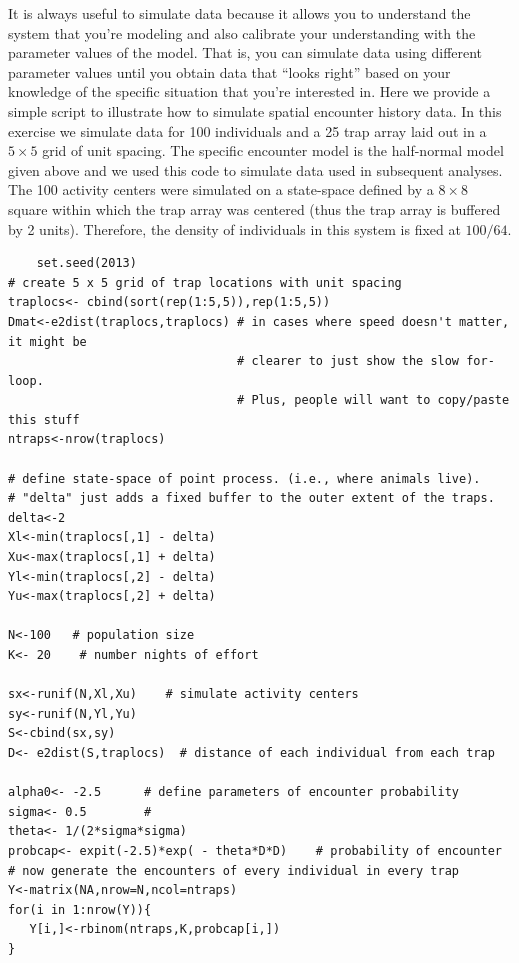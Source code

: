 It is always useful to simulate data because it allows you to
understand the system that you're modeling and also calibrate your
understanding with the parameter values of the model. That is, you can
simulate data using different parameter values until you obtain data
that ``looks right'' based on your knowledge of the specific situation
that you're interested in. Here we provide a simple script to
illustrate how to simulate spatial encounter history data. In this
exercise we simulate data for 100 individuals and a 25 trap array laid
out in a $5 \times 5$ grid of unit spacing.  The specific encounter model is
the half-normal model given above and we used this code to simulate
data used in subsequent analyses.  The 100 activity centers were
simulated on a state-space defined by a $8 \times 8$ square within which the
trap array was centered (thus the trap array is buffered by 2
units). Therefore, the density of individuals in this system is fixed
at $100/64$.

{\small 
\begin{verbatim}
	set.seed(2013)
# create 5 x 5 grid of trap locations with unit spacing
traplocs<- cbind(sort(rep(1:5,5)),rep(1:5,5))
Dmat<-e2dist(traplocs,traplocs) # in cases where speed doesn't matter, it might be  
                                # clearer to just show the slow for-loop. 
                                # Plus, people will want to copy/paste this stuff
ntraps<-nrow(traplocs)

# define state-space of point process. (i.e., where animals live).
# "delta" just adds a fixed buffer to the outer extent of the traps. 
delta<-2
Xl<-min(traplocs[,1] - delta)
Xu<-max(traplocs[,1] + delta)
Yl<-min(traplocs[,2] - delta)
Yu<-max(traplocs[,2] + delta)

N<-100   # population size
K<- 20    # number nights of effort

sx<-runif(N,Xl,Xu)    # simulate activity centers
sy<-runif(N,Yl,Yu)
S<-cbind(sx,sy) 
D<- e2dist(S,traplocs)  # distance of each individual from each trap

alpha0<- -2.5      # define parameters of encounter probability
sigma<- 0.5        #
theta<- 1/(2*sigma*sigma)
probcap<- expit(-2.5)*exp( - theta*D*D)    # probability of encounter
# now generate the encounters of every individual in every trap
Y<-matrix(NA,nrow=N,ncol=ntraps)
for(i in 1:nrow(Y)){
   Y[i,]<-rbinom(ntraps,K,probcap[i,])
}
\end{verbatim}
}


